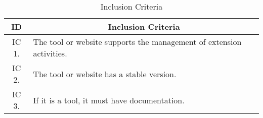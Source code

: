 \begin{table}
  \centering
  \caption{Inclusion Criteria}
  \label{tbl:gl-inclusion-criteria}
  \footnotesize
  \begin{tabular}{c|l}
    \bottomrule
    \rowcolor[rgb]{0.753,0.753,0.753} \textbf{ID} & \multicolumn{1}{c}{\textbf{Inclusion Criteria}}                      \\
    \hline
    \rowcolor[HTML]{DEDEDE}
    IC 1.                                         & The tool or website supports the management of extension activities. \\
    IC 2.                                         & The tool or website has a stable version.                            \\
    \rowcolor[HTML]{DEDEDE}
    IC 3.                                         & If it is a tool, it must have documentation.                         \\
    \toprule
  \end{tabular}
\end{table}